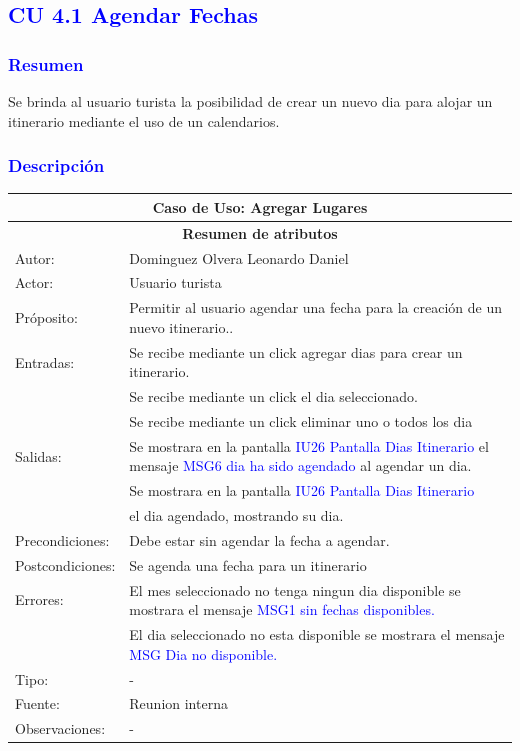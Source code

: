 \subsection{\textcolor{blue}{CU 4.1 Agendar Fechas}}

\subsubsection{\textcolor{blue}{Resumen}}
Se brinda al usuario turista la posibilidad de crear un nuevo dia para alojar un itinerario mediante el uso de un calendarios.
\subsubsection{\textcolor{blue}{Descripción}}
\begin{tabularx}{16cm}{||l|X||}
	\hline
	\multicolumn{2}{||c||}{Caso de Uso: Agregar Lugares} \\
	\hline
	\multicolumn{2}{||c||}{\textbf{Resumen de atributos}} \\
	\hline
	{Autor:} & Dominguez Olvera Leonardo Daniel \\
    \hline
	{Actor:} & Usuario turista\\
	\hline
	{Próposito:} & Permitir al usuario agendar una fecha para la creación de un nuevo itinerario..\\
	\hline
	{Entradas:}&Se recibe mediante un click agregar dias para crear un itinerario.\\
  &Se recibe mediante un click el dia seleccionado.\\
  & Se recibe mediante un click eliminar uno o todos los dia \\
	\hline
	{Salidas:} &Se mostrara en la pantalla \textcolor{blue}{IU26 Pantalla Dias Itinerario} el mensaje \textcolor{blue}{MSG6 dia ha sido agendado} al agendar un dia.  \\
  & Se mostrara en la pantalla \textcolor{blue}{IU26 Pantalla Dias Itinerario}\\
  &el dia agendado, mostrando su dia.\\
	\hline
	{Precondiciones:} & Debe estar sin agendar la fecha a agendar.\\
	\hline
	{Postcondiciones:}  & Se agenda una fecha para un itinerario\\
	\hline
	{Errores:} & El mes seleccionado no tenga ningun dia disponible se mostrara el mensaje \textcolor{blue}{MSG1 sin fechas disponibles.} \\
 & El dia seleccionado no esta disponible se mostrara el mensaje \textcolor{blue}{MSG Dia no disponible.} \\
  
	\hline
	{Tipo:} & -\\
	\hline
	{Fuente:} & Reunion interna \\
	\hline
	{Observaciones:} & {-} \\
	\hline
\end{tabularx}

